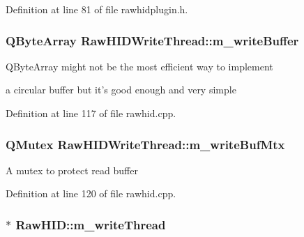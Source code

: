Definition at line 81 of file rawhidplugin.\-h.

\hypertarget{group___raw_h_i_d_plugin_ga4b0316d5c6599d45686fc5066a246e7e}{
\subsubsection[{m\-\_\-write\-Buffer}]{\setlength{\rightskip}{0pt plus 5cm}Q\-Byte\-Array Raw\-H\-I\-D\-Write\-Thread\-::m\-\_\-write\-Buffer\hspace{0.3cm}{\ttfamily [protected]}}}\label{group___raw_h_i_d_plugin_ga4b0316d5c6599d45686fc5066a246e7e}
\begin{DoxyVerb}QByteArray might not be the most efficient way to implement
\end{DoxyVerb}
 a circular buffer but it's good enough and very simple 

Definition at line 117 of file rawhid.\-cpp.

\hypertarget{group___raw_h_i_d_plugin_gaa53a045dd368b7ad82ac5853679019e0}{
\subsubsection[{m\-\_\-write\-Buf\-Mtx}]{\setlength{\rightskip}{0pt plus 5cm}Q\-Mutex Raw\-H\-I\-D\-Write\-Thread\-::m\-\_\-write\-Buf\-Mtx\hspace{0.3cm}{\ttfamily [protected]}}}\label{group___raw_h_i_d_plugin_gaa53a045dd368b7ad82ac5853679019e0}
A mutex to protect read buffer 

Definition at line 120 of file rawhid.\-cpp.

\hypertarget{group___raw_h_i_d_plugin_ga103f382a48fee4b9fe034b3d88f45d42}{
\subsubsection[{m\-\_\-write\-Thread}]{$\ast$ Raw\-H\-I\-D\-::m\-\_\-write\-Thread\hspace{0.3cm}{\ttfamily [protected]}}}\label{group___raw_h_i_d_plugin_ga103f382a48fee4b9fe034b3d88f45d42}


